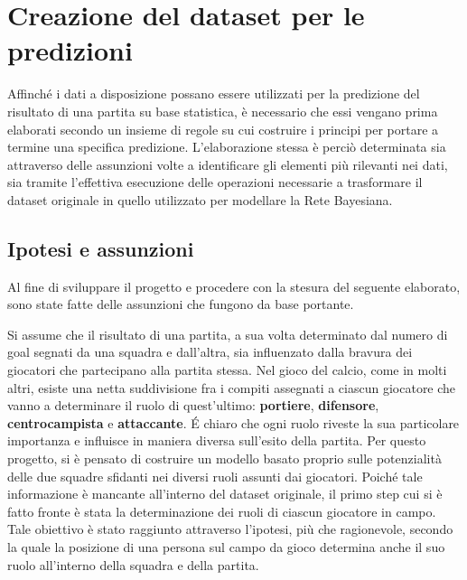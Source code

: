 \documentclass[hidelinks, 12pt]{article}
\begin{document}
\clearpage



\section{Creazione del dataset per le predizioni}

Affinché i dati a disposizione possano essere utilizzati per la predizione del risultato di una partita su base statistica, è necessario che essi vengano prima elaborati secondo un insieme di regole su cui costruire i principi per portare a termine una specifica predizione. L'elaborazione stessa è perciò determinata sia attraverso delle assunzioni volte a identificare gli elementi più rilevanti nei dati, sia tramite l'effettiva esecuzione delle operazioni necessarie a trasformare il dataset originale in quello utilizzato per modellare la Rete Bayesiana.



\subsection{Ipotesi e assunzioni}
\label{sec:dataset-hypotesis}

Al fine di sviluppare il progetto e procedere con la stesura del seguente elaborato, sono state fatte delle assunzioni che fungono da base portante.

Si assume che il risultato di una partita, a sua volta determinato dal numero di goal segnati da una squadra e dall'altra, sia influenzato dalla bravura dei giocatori che partecipano alla partita stessa. Nel gioco del calcio, come in molti altri, esiste una netta suddivisione fra i compiti assegnati a ciascun giocatore che vanno a determinare il ruolo di quest'ultimo: \textbf{portiere}, \textbf{difensore}, \textbf{centrocampista} e \textbf{attaccante}. É chiaro che ogni ruolo riveste la sua particolare importanza e influisce in maniera diversa sull'esito della partita. Per questo progetto, si è pensato di costruire un modello basato proprio sulle potenzialità delle due squadre sfidanti nei diversi ruoli assunti dai giocatori. Poiché tale informazione è mancante all'interno del dataset originale, il primo step cui si è fatto fronte è stata la determinazione dei ruoli di ciascun giocatore in campo. Tale obiettivo è stato raggiunto attraverso l'ipotesi, più che ragionevole, secondo la quale la posizione di una persona sul campo da gioco determina anche il suo ruolo all'interno della squadra e della partita.
\end{document}
